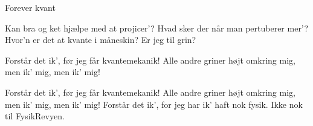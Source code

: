 \begin{song}{Forever kvant}
  \begin{SBVerse}
    Kan bra og ket hjælpe med at projicer'?
    Hvad sker der når man pertuberer mer'?
    Hvor'n er det at kvante i måneskin?
    Er jeg til grin?
  \end{SBVerse}

  \begin{SBChorus}
    Forstår det ik',
    før jeg får kvantemekanik!
    Alle andre griner højt omkring mig,
    men ik' mig,
    men ik' mig!
  \end{SBChorus}

  \begin{SBChorus}
    Forstår det ik',
    før jeg får kvantemekanik!
    Alle andre griner højt omkring mig,
    men ik' mig,
    men ik' mig!
    Forstår det ik',
    for jeg har ik' haft nok fysik.
    Ikke nok til FysikRevyen.
  \end{SBChorus}
\end{song}